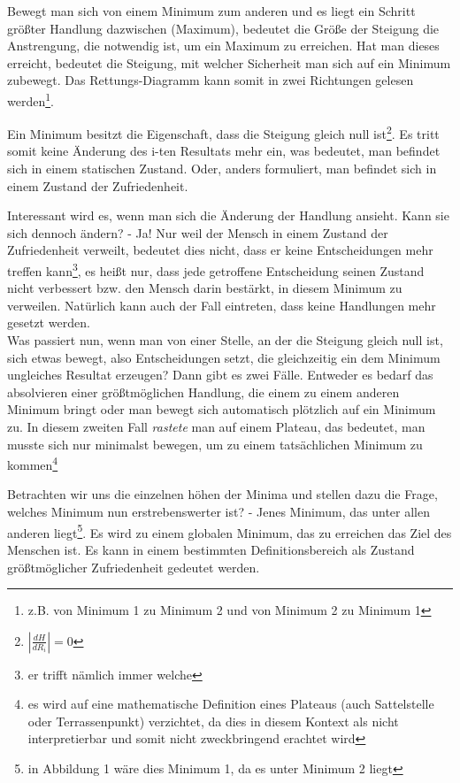 \documentclass[12pt,a4paper,oneside]{article}
\begin{document}
  Bewegt man sich von einem Minimum zum anderen und es liegt ein Schritt größter Handlung dazwischen (Maximum), bedeutet die Größe der Steigung die Anstrengung, die notwendig ist, um ein Maximum zu erreichen. Hat man dieses erreicht, bedeutet die Steigung, mit welcher Sicherheit man sich auf ein Minimum zubewegt. Das Rettungs-Diagramm kann somit in zwei Richtungen gelesen werden\footnote{z.B. von Minimum 1 zu Minimum 2 und von Minimum 2 zu Minimum 1}. 
  
  Ein Minimum besitzt die Eigenschaft, dass die Steigung gleich null ist\footnote{$|\frac{dH}{dR_i}| = 0$}. Es tritt somit keine Änderung des i-ten Resultats mehr ein, was bedeutet, man befindet sich in einem statischen Zustand. Oder, anders formuliert, man befindet sich in einem Zustand der Zufriedenheit. 
  
  Interessant wird es, wenn man sich die Änderung der Handlung ansieht. Kann sie sich dennoch ändern? - Ja! Nur weil der Mensch in einem Zustand der Zufriedenheit verweilt, bedeutet dies nicht, dass er keine Entscheidungen mehr treffen kann\footnote{er trifft nämlich immer welche}, es heißt nur, dass jede getroffene Entscheidung seinen Zustand nicht verbessert bzw. den Mensch darin bestärkt, in diesem Minimum zu verweilen. Natürlich kann auch der Fall eintreten, dass keine Handlungen mehr gesetzt werden.\\
  
  Was passiert nun, wenn man von einer Stelle, an der die Steigung gleich null ist, sich etwas bewegt, also Entscheidungen setzt, die gleichzeitig ein dem Minimum ungleiches Resultat erzeugen? Dann gibt es zwei Fälle. Entweder es bedarf das absolvieren einer größtmöglichen Handlung, die einem zu einem anderen Minimum bringt oder man bewegt sich automatisch plötzlich auf ein Minimum zu. In diesem zweiten Fall \textit{rastete} man auf einem Plateau, das bedeutet, man musste sich nur minimalst bewegen, um zu einem tatsächlichen Minimum zu kommen\footnote{es wird auf eine mathematische Definition eines Plateaus (auch Sattelstelle oder Terrassenpunkt) verzichtet, da dies in diesem Kontext als nicht interpretierbar und somit nicht zweckbringend erachtet wird}  
  
  Betrachten wir uns die einzelnen höhen der Minima und stellen dazu die Frage, welches Minimum nun erstrebenswerter ist? - Jenes Minimum, das unter allen anderen liegt\footnote{in Abbildung 1 wäre dies Minimum 1, da es unter Minimum 2 liegt}. Es wird zu einem globalen Minimum, das zu erreichen das Ziel des Menschen ist. Es kann in einem bestimmten Definitionsbereich als Zustand größtmöglicher Zufriedenheit gedeutet werden. \\
  
\end{document}
